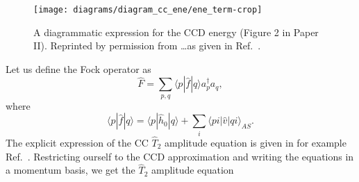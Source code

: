 \documentclass[a4paper,12pt]{report}
\begin{document}
\begin{figure} 
  \centering
  \texttt{[image: diagrams/diagram\_cc\_ene/ene\_term-crop]}
  \caption{A diagrammatic expression for the CCD energy (Figure 2 in Paper II). Reprinted by permission from \dots as given in Ref.~\cite{baardsen}.}
  \label{fig:ene_ccd}
\end{figure}

Let us define the Fock operator as
\begin{equation}
  \hat{F} = \sum_{p,q}\langle p|\hat{f}|q\rangle 
  a_{p}^{\dagger }a_{q},
\end{equation}
where 
\begin{equation}
  \langle p|\hat{f}|q\rangle = \langle p|\hat{h}_{0}|q\rangle 
  + \sum_{i}\langle pi|\hat{v}|qi\rangle_{AS}.
  \label{eq:fock_matr_ele}
\end{equation}
The explicit expression of the CC $\hat{T}_{2}$ amplitude equation is given in for example Ref.~\cite{crawford}. Restricting ourself to the CCD approximation and writing the equations in a momentum basis, we get the $\hat{T}_{2}$ amplitude equation
\end{document}
